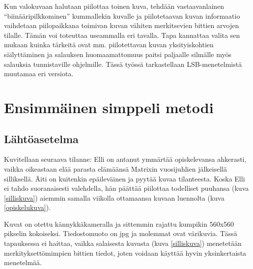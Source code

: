 \documentclass[a4paper,11pt]{article}
\begin{document}
Kun valokuvaan halutaan piilottaa toinen kuva, tehdään vastaavanlainen \enquote{biinääripilkkominen} kummallekin kuvalle ja piilotetaavan kuvan informaatio vaihdetaan piilopaikkana toimivan kuvan vähiten merkitsevien bittien arvojen tilalle. Tämän voi toteuttaa useammalla eri tavalla. Tapa kannattaa valita sen mukaan kuinka tärkeitä ovat mm. piilotettavan kuvan yksityiskohtien säilyttäminen ja salauksen huomaamattomuus paitsi paljaalle silmälle myös salauksia tunnistaville ohjelmille. Tässä työssä tarkastellaan LSB-menetelmistä muutamaa eri versiota.

\section{Ensimmäinen simppeli metodi}
\subsection{Lähtöasetelma}
Kuvitellaan seuraava tilanne: Elli on antanut ymmärtää opiskelevansa ahkerasti, vaikka oikeastaan elää parasta elämäänsä Matrixin vuosijuhlien jälkeisellä silliksellä. Äiti on kuitenkin epäileväinen ja pyytää kuvaa tilanteesta. Koska Elli ei tahdo suoranaisesti valehdella, hän päättää piilottaa todelliset puuhansa (kuva \ref{silliskuva}) aiemmin samalla viikolla ottamaansa kuvaan luennolta (kuva \ref{opiskelukuva}).

Kuvat on otettu kännykkäkameralla ja sittemmin rajattu kumpikin 560x560 pikselin kokoiseksi. Tiedostomuoto on jpg ja molemmat ovat värikuvia. Tässä tapauksessa ei haittaa, vaikka salaisesta kuvasta (kuva \ref{silliskuva}) menetetään merkityksettömimpien bittien tiedot, joten voidaan käyttää hyvin yksinkertaista menetelmää.
\end{document}

